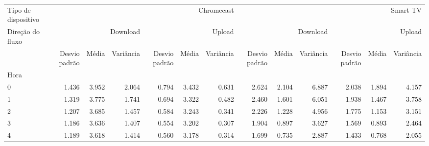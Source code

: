 \begin{tabular}{lrrrrrrrrrrrr}
	\toprule
	Tipo de dispositivo & \multicolumn{6}{r}{Chromecast} & \multicolumn{6}{r}{Smart TV}                                                                                                                                                         \\
	Direção do fluxo    & \multicolumn{3}{r}{Download}   & \multicolumn{3}{r}{Upload}   & \multicolumn{3}{r}{Download} & \multicolumn{3}{r}{Upload}                                                                                             \\
	                    & Desvio padrão                  & Média                        & Variância                    & Desvio padrão              & Média & Variância & Desvio padrão & Média & Variância & Desvio padrão & Média & Variância \\
	Hora                &                                &                              &                              &                            &       &           &               &       &           &               &       &           \\
	\midrule
	0                   & 1.436                          & 3.952                        & 2.064                        & 0.794                      & 3.432 & 0.631     & 2.624         & 2.104 & 6.887     & 2.038         & 1.894 & 4.157     \\
	1                   & 1.319                          & 3.775                        & 1.741                        & 0.694                      & 3.322 & 0.482     & 2.460         & 1.601 & 6.051     & 1.938         & 1.467 & 3.758     \\
	2                   & 1.207                          & 3.685                        & 1.457                        & 0.584                      & 3.243 & 0.341     & 2.226         & 1.228 & 4.956     & 1.775         & 1.153 & 3.151     \\
	3                   & 1.186                          & 3.636                        & 1.407                        & 0.554                      & 3.202 & 0.307     & 1.904         & 0.897 & 3.627     & 1.569         & 0.893 & 2.464     \\
	4                   & 1.189                          & 3.618                        & 1.414                        & 0.560                      & 3.178 & 0.314     & 1.699         & 0.735 & 2.887     & 1.433         & 0.768 & 2.055     \\

\end{tabular}
